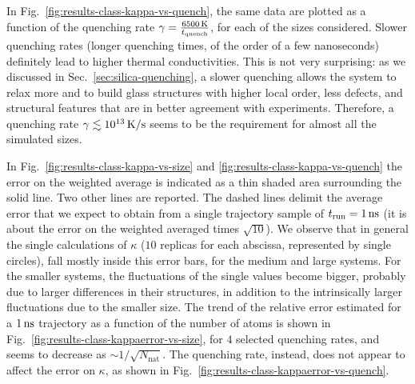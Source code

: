 In Fig.~\ref{fig:results-class-kappa-vs-quench}, the same data are plotted as a function of the quenching rate $\gamma = \frac{6500\,\mathrm{K}}{t_{\mathrm{quench}}}$, for each of the sizes considered. 
Slower quenching rates (longer quenching times, of the order of a few nanoseconds) definitely lead to higher thermal conductivities. 
This is not very surprising: as we discussed in Sec.~\ref{sec:silica-quenching}, a slower quenching allows the system to relax more and to build glass structures with higher local order, less defects, and structural features that are in better agreement with experiments. 
Therefore, a quenching rate $\gamma \lesssim 10^{13}\,\mathrm{K/s}$ seems to be the requirement for almost all the simulated sizes. 

In Fig.~\ref{fig:results-class-kappa-vs-size} and \ref{fig:results-class-kappa-vs-quench} the error on the weighted average is indicated as a thin shaded area surrounding the solid line. Two other lines are reported. The dashed lines delimit the average error that we expect to obtain from a single trajectory sample of $t_{\mathrm{run}}=1\,\mathrm{ns}$ (it is about the error on the weighted averaged times $\sqrt{10}$). 
We observe that in general the single calculations of $\kappa$ ($10$ replicas for each abscissa, represented by single circles), fall mostly inside this error bars, for the medium and large systems. For the smaller systems, the fluctuations of the single values become bigger, probably due to larger differences in their structures, in addition to the intrinsically larger fluctuations due to the smaller size. 
The trend of the relative error estimated for a $1\,\mathrm{ns}$ trajectory as a function of the number of atoms is shown in Fig.~\ref{fig:results-class-kappaerror-vs-size}, for $4$ selected quenching rates, and seems to decrease as $\sim 1/\sqrt{N_\mathrm{nat}}$. 
The quenching rate, instead, does not appear to affect the error on $\kappa$, as shown in Fig.~\ref{fig:results-class-kappaerror-vs-quench}. 

